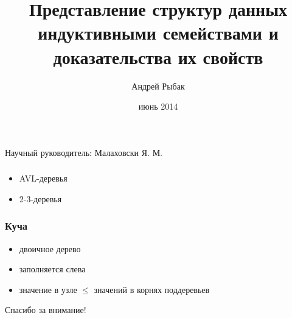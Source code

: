 \documentclass[17pt]{beamer}
\title{Представление структур данных индуктивными семействами и доказательства их свойств}
\institute{НИУ ИТМО}
\author{Андрей Рыбак}
\date{
июнь 2014
}
\begin{document}
{
\fontsize{14pt}{14pt}\selectfont
{}
\begin{frame}
  \maketitle
  \begin{flushright}
    Научный руководитель: Малаховски Я. М.
  \end{flushright}
\end{frame}
}


\begin{frame}
    \frametitle{}
    \begin{itemize}
        \item AVL-деревья
        \item 2-3-деревья
    \end{itemize}
\end{frame}

\AgdaHide{

}

\begin{frame}
    \frametitle{Куча}
    \begin{itemize}
        \item двоичное дерево
        \item заполняется слева
        \item значение в узле $ \leq $ значений в корнях поддеревьев
    \end{itemize}
\end{frame}
\fontsize{14pt}{14pt}\selectfont


\begin{frame}
    \begin{center}
        \Large Спасибо за внимание!
    \end{center}
\end{frame}
\end{document}
